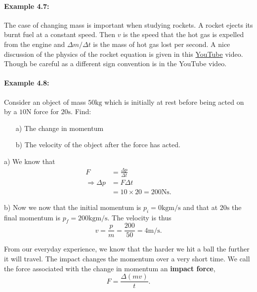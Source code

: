 \documentclass[a4paper,12pt]{book}
\begin{document}
\paragraph{Example 4.7:} The case of changing mass is important when studying rockets. A rocket ejects its burnt fuel at a constant speed. Then $v$ is the speed that the hot gas is expelled from the engine and $\Delta m/\Delta t$ is the mass of hot gas lost per second.  A nice discussion of the physics of the rocket equation is given in this \href{https://www.youtube.com/watch?v=V_brZ-KWY3g}{YouTube} video. Though be careful as a different sign convention is in the YouTube video.

\paragraph{Example 4.8:} Consider an object of mass $50 \text{kg}$ which is initially at rest before being acted on by a $10\text{N}$ force for $20\text{s}$. Find:
\begin{itemize}
\setlength{\itemsep}{-5pt}
    \item[a)] The change in momentum
    \item[b)] The velocity of the object after the force has acted.
\end{itemize} 

a) We know that 
\begin{align*}
F&=\frac{\Delta p}{\Delta t}\\
\Rightarrow \Delta p&=F\Delta t\\
&=10\times 20 =200 \text{Ns}.
\end{align*}

b) Now we now that the initial momentum is $p_{i}=0\text{kgm/s}$ and that at $20\text{s}$ the final momentum is $p_{f}=200\text{kgm/s}$. The velocity is thus
\begin{equation*}
v=\frac{p}{m}=\frac{200}{50}=4\text{m/s}.
\end{equation*}

From our everyday experience, we know that the harder we hit a ball the further it will travel. The impact changes the momentum over a very short time. We call the force associated with the change in momentum an \textbf{impact force},
\begin{equation*}
F=\frac{\Delta\left(mv\right)}{t}.
\end{equation*}
\end{document}
